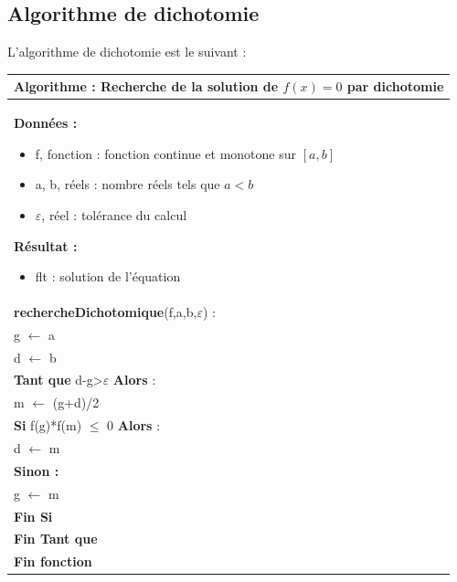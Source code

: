 \documentclass[10pt,fleqn]{article} %
\begin{document}
\subsection{Algorithme de dichotomie}

L'algorithme de dichotomie est le suivant :

\begin{pseudo}
\begin{center}
\begin{tabular}{p{}}
\hline
\textbf{Algorithme :} Recherche de la solution de $f(x)=0$ par dichotomie \\
\hline
\textbf{Données :}
\begin{itemize}
\item \textsf{f}, fonction : fonction continue et monotone sur $[a,b]$
\item \textsf{a, b}, réels : nombre réels tels que $a<b$
\item \textsf{$\varepsilon$}, réel : tolérance du calcul
\end{itemize}
\textbf{Résultat :} 
\begin{itemize}
\item flt : solution de l'équation
\end{itemize}
\\
\textbf{rechercheDichotomique}(\textsf{f,a,b,$\varepsilon$}) :\\
\hspace{.4cm}\textsf{g} $\leftarrow$ \textsf{a} \\
\hspace{.4cm}\textsf{d} $\leftarrow$ \textsf{b} \\
\hspace{.4cm}\textbf{Tant que} \textsf{d-g>$\varepsilon$} \textbf{Alors} : \\
\hspace{.8cm}\textsf{m} $\leftarrow$ \textsf{(g+d)/2} \\
\hspace{.8cm}\textbf{Si} \textsf{f(g)*f(m) $\leq$ 0} \textbf{Alors} : \\
\hspace{1.2cm}\textsf{d $\leftarrow$  m} \\
\hspace{.8cm} \textbf{Sinon :} \\
\hspace{1.2cm}\textsf{g $\leftarrow$  m} \\
\hspace{.8cm} \textbf{Fin Si}\\
\hspace{.4cm} \textbf{Fin Tant que}\\
\textbf{Fin fonction} \\
\hline
\end{tabular}
\end{center}
\end{pseudo}
\end{document}
